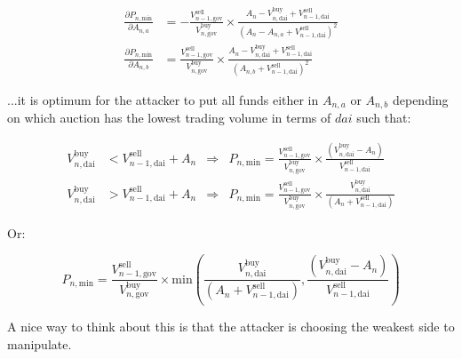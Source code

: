 \documentclass{article}
\begin{document}
\begin{align}
    \frac{\partial P_{n,\mathrm{min}}}{\partial A_{n,a}} &= - \frac{V_{n-1, \mathrm{gov}}^{\mathrm{sell}}}{V_{n, \mathrm{gov}}^{\mathrm{buy}}} \times \frac{A_n - V_{n, \mathrm{dai}}^{\mathrm{buy}} + V_{n-1, \mathrm{dai}}^{\mathrm{sell}}}{(A_n - A_{n,a} + V_{n-1, \mathrm{dai}}^{\mathrm{sell}})^2}\\
    \frac{\partial P_{n,\mathrm{min}}}{\partial A_{n,b}} &= \frac{V_{n-1, \mathrm{gov}}^{\mathrm{sell}}}{V_{n, \mathrm{gov}}^{\mathrm{buy}}} \times \frac{A_n - V_{n, \mathrm{dai}}^{\mathrm{buy}} + V_{n-1, \mathrm{dai}}^{\mathrm{sell}}}{(A_{n,b} + V_{n-1, \mathrm{dai}}^{\mathrm{sell}})^2}
\end{align}

...it is optimum for the attacker to put all funds either in $A_{n,a}$ or $A_{n,b}$ depending on which auction has the lowest trading volume in terms of $dai$ such that:


\begin{align}
    V_{n, \mathrm{dai}}^{\mathrm{buy}} &< V_{n-1, \mathrm{dai}}^{\mathrm{sell}} + A_n &\Rightarrow &P_{n, \mathrm{min}} = \frac{V_{n-1, \mathrm{gov}}^{\mathrm{sell}}}{V_{n, \mathrm{gov}}^{\mathrm{buy}}}  \times  \frac{(V_{n, \mathrm{dai}}^{\mathrm{buy}} - A_{n})} {V_{n-1, \mathrm{dai}}^{\mathrm{sell}}}\\
    V_{n, \mathrm{dai}}^{\mathrm{buy}} &> V_{n-1, \mathrm{dai}}^{\mathrm{sell}} + A_n &\Rightarrow &P_{n, \mathrm{min}} = \frac{V_{n-1, \mathrm{gov}}^{\mathrm{sell}}}{V_{n, \mathrm{gov}}^{\mathrm{buy}}}  \times \frac{V_{n, \mathrm{dai}}^{\mathrm{buy}}} {(A_n + V_{n-1, \mathrm{dai}}^{\mathrm{sell}})}
\end{align}

Or:

\begin{equation}
    P_{n, \mathrm{min}} = \frac{V_{n-1, \mathrm{gov}}^{\mathrm{sell}}}{V_{n, \mathrm{gov}}^{\mathrm{buy}}}  \times \mathrm{min} \left(\frac{V_{n, \mathrm{dai}}^{\mathrm{buy}}} {(A_n + V_{n-1, \mathrm{dai}}^{\mathrm{sell}})}, \frac{(V_{n, \mathrm{dai}}^{\mathrm{buy}} - A_{n})} {V_{n-1, \mathrm{dai}}^{\mathrm{sell}}} \right)
\end{equation}


A nice way to think about this is that the attacker is choosing the weakest side to manipulate.
\end{document}
